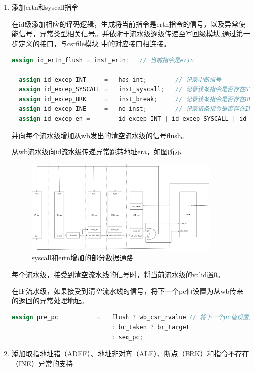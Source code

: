 \documentclass[11pt]{article}
\begin{document}
\begin{enumerate}
\item 添加ertn和syscall指令

在id级添加相应的译码逻辑，生成将当前指令是ertn指令的信号，以及异常使能信号，异常类型相关信号。并依附于流水级逐级传递至写回级模块,通过第一步定义的接口，与csrfile模块
中的对应接口相连接。
\begin{lstlisting}[language=verilog]
  assign id_ertn_flush = inst_ertn;   // 当前指令是ertn

  assign id_excep_INT     =   has_int;        // 记录中断信号
  assign id_excep_SYSCALL =   inst_syscall;   // 记录该条指令是否存在SYSCALL异常
  assign id_excep_BRK     =   inst_break;     // 记录该条指令是否存在BRK异常
  assign id_excep_INE     =   no_inst;        // 记录该条指令是否存在INE异常
  assign id_excep_en =        id_excep_INT | id_excep_SYSCALL | id_excep_BRK | id_excep_INE | if_excep_en;         //只要有一个异常就置1
\end{lstlisting}

并向每个流水级增加从wb发出的清空流水级的信号flush。

从wb流水级向id流水级传递异常跳转地址era，如图所示
\begin{figure}[h!]
  \centering
  \includegraphics[width=0.9\textwidth]{./fig/fig1.png}
  \caption{syscall和ertn增加的部分数据通路}
\end{figure}
每个流水级，接受到清空流水线的信号时，将当前流水级的valid置0。

在IF流水级，如果接受到清空流水线的信号，将下一个pc值设置为从wb传来的返回的异常处理地址。
\begin{lstlisting}[language=verilog]
  assign pre_pc           =   flush ? wb_csr_rvalue // 将下一个pc值设置为从wb传来的返回的异常处理地址
                            : br_taken ? br_target 
                            : seq_pc;
\end{lstlisting}

\item  添加取指地址错（ADEF）、地址非对齐（ALE）、断点（BRK）和指令不存在（INE）异常的支持


\end{enumerate}
\end{document}
